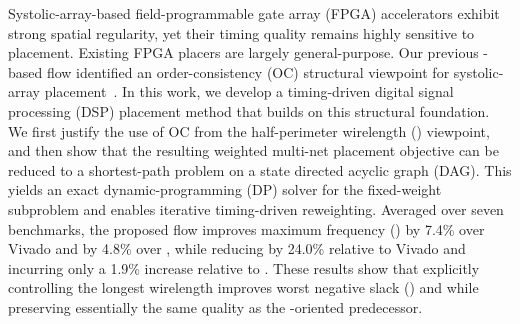 Systolic-array-based field-programmable gate array (FPGA) accelerators exhibit strong spatial regularity, yet their timing quality remains highly sensitive to placement. Existing FPGA placers are largely general-purpose. Our previous \rsad-based flow identified an order-consistency (OC) structural viewpoint for systolic-array placement~\cite{rsad2023}. In this work, we develop a timing-driven digital signal processing (DSP) placement method that builds on this structural foundation. We first justify the use of OC from the half-perimeter wirelength (\hpwl) viewpoint, and then show that the resulting weighted multi-net placement objective can be reduced to a shortest-path problem on a state directed acyclic graph (DAG). This yields an exact dynamic-programming (DP) solver for the fixed-weight subproblem and enables iterative timing-driven reweighting. Averaged over seven benchmarks, the proposed flow improves maximum frequency (\fmax) by 7.4\% over Vivado and by 4.8\% over \rsad, while reducing \hpwl by 24.0\% relative to Vivado and incurring only a 1.9\% increase relative to \rsad. These results show that explicitly controlling the longest wirelength improves worst negative slack (\wns) and \fmax while preserving essentially the same \hpwl quality as the \hpwl-oriented predecessor.
